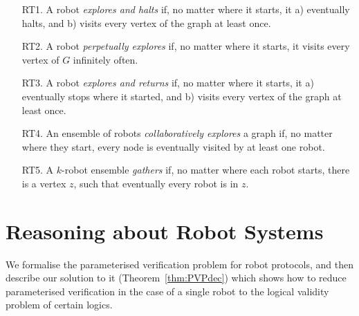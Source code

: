 \documentclass{aamas2015}
\def\nat{\mathbb{N}}
\newcommand{\tup}[1]{\overline{#1}}
\newcommand{\sr}[1]{\footnote{{\color{red} Note. #1}}}
\begin{document}
\begin{enumerate}
\item[RT1.] A robot {\em explores and halts} if, no matter where it starts, it a) eventually halts, and b) visits every vertex of the graph at least once. 
\item[RT2.] A robot {\em perpetually explores} if, no matter where it starts, it visits every vertex of $G$ infinitely often.
\item[RT3.] A robot {\em explores and returns} if, no matter where it starts, it a) eventually stops where it started, and b) visits every vertex of the graph at least once.
\item[RT4.] An ensemble of robots {\em collaboratively explores} a graph if, no matter where they start, every node is eventually visited by at least one robot.
\item[RT5.] A $k$-robot ensemble {\em gathers} if, no matter where each robot starts, there is a vertex $z$, such that eventually every robot is in $z$.

\end{enumerate}



\section{Reasoning about Robot Systems}

We formalise the parameterised verification problem for robot protocols, and then describe our solution to it (Theorem~\ref{thm:PVPdec}) which shows how to reduce parameterised verification in the case of a single robot to the logical validity problem of certain logics.
\end{document}
